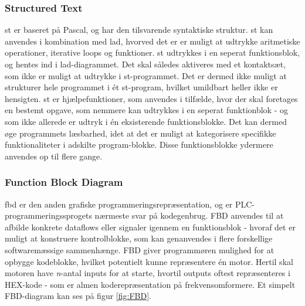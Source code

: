 \subsubsection{Structured Text}
\gls{st} er baseret på Pascal, og har den tilsvarende syntaktiske struktur. \gls{st} kan anvendes i kombination med \gls{lad}, hvorved det er er muligt at udtrykke aritmetiske operationer, iterative loops og funktioner. \gls{st} udtrykkes i en seperat funktionsblok, og hentes ind i \gls{lad}-diagrammet. Det skal således aktiveres med et kontaktsæt, som ikke er muligt at udtrykke i \gls{st}-programmet. Det er dermed ikke muligt at strukturer hele programmet i ét \gls{st}-program, hvilket umildbart heller ikke er hensigten. \gls{st} er hjælpefunktioner, som anvendes i tilfælde, hvor der skal foretages en bestemt opgave, som nemmere kan udtrykkes i en seperat funktionblok - og som ikke allerede er udtryk i én eksisterende funktionsblokke. Det kan dermed øge programmets læsbarhed, idet at det er muligt at kategorisere specifikke funktionaliteter i adskilte program-blokke. Disse funktionsblokke ydermere anvendes op til flere gange. 




\subsubsection{Function Block Diagram}
\gls{fbd} er den anden grafiske programmeringsrepræsentation, og er PLC-programmeringssprogets nærmeste svar på kodegenbrug. FBD anvendes til at afbilde konkrete dataflows eller signaler igennem en funktionsblok - hvoraf det er muligt at konstruere kontrolblokke, som kan genanvendes i flere forskellige softwaremæssige sammenhænge. FBD giver programmøren mulighed for at opbygge kodeblokke, hvilket potentielt kunne repræsentere én motor. Hertil skal motoren have \textit{n}-antal inputs for at starte, hvortil outputs oftest repræsenteres i HEX-kode - som er almen koderepræsentation på frekvensomformere. Et simpelt FBD-diagram kan ses på figur \ref{fig:FBD}.

